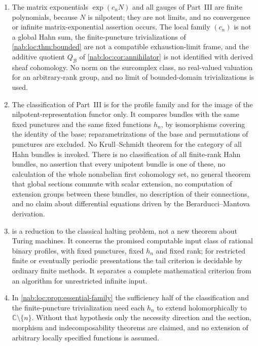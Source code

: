 \documentclass[11pt,letterpaper]{article}
\theoremstyle{definition}
\theoremstyle{remark}
\newcommand{\C}{\mathbb C}
\newcommand{\BB}{\mathscr B}
\numberwithin{equation}{section}
\begin{document}
\begin{enumerate}
\item\label{nab:loc:nc:finite}
The matrix exponentials $\exp(c_nN)$ and all gauges of Part~III are finite
polynomials, because $N$ is nilpotent; they are not limits, and no convergence
or infinite matrix-exponential assertion occurs. The local family $(c_n)$ is
not a global Hahn sum, the finite-puncture trivializations of
\cref{nab:loc:thm:bounded} are not a compatible exhaustion-limit frame, and the
additive quotient $Q_{\BB}$ of \cref{nab:loc:cor:annihilator} is not identified
with derived sheaf cohomology. No norm on the surcomplex class, no real-valued
valuation for an arbitrary-rank group, and no limit of bounded-domain
trivializations is used.

\item\label{nab:loc:nc:classification}
The classification of Part~III is for the profile family and for the image of
the nilpotent-representation functor only. It compares bundles with the same
fixed punctures and the same fixed functions $h_n$, by isomorphisms covering
the identity of the base; reparametrizations of the base and permutations of
punctures are excluded. No Krull--Schmidt theorem for the category of all Hahn
bundles is invoked. There is no classification of all finite-rank Hahn bundles,
no assertion that every unipotent bundle is one of these, no calculation of the
whole nonabelian first cohomology set, no general theorem that global sections
commute with scalar extension, no computation of extension groups between these
bundles, no description of their connections, and no claim about differential
equations driven by the Berarducci--Mantova derivation.

\item\label{nab:loc:nc:undecidable}
 is a reduction to the classical halting problem,
not a new theorem about Turing machines. It concerns the promised computable
input class of rational binary profiles, with fixed punctures, fixed $h_n$ and
fixed rank; for restricted finite or eventually periodic presentations the tail
criterion is decidable by ordinary finite methods. It separates a complete
mathematical criterion from an algorithm for unrestricted infinite input.

\item\label{nab:loc:nc:essential}
In \cref{nab:loc:prop:essential-family} the sufficiency half of the
classification and the finite-puncture trivialization need each $h_n$ to
extend holomorphically to $\C\setminus\{n\}$. Without that hypothesis only the
necessity direction and the section, morphism and indecomposability theorems
are claimed, and no extension of arbitrary locally specified functions is
assumed.


\end{enumerate}
\end{document}
